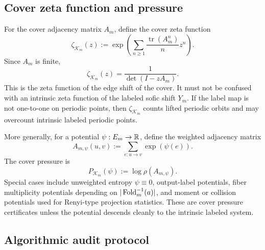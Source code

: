 \subsection{Cover zeta function and pressure}

For the cover adjacency matrix \(A_m\), define the cover zeta function
\[
\zeta_{\mathcal K_m}(z)
:=
\exp\left(\sum_{n\ge1}\frac{\operatorname{tr}(A_m^n)}{n}z^n\right).
\]
Since \(A_m\) is finite,
\[
\zeta_{\mathcal K_m}(z)=\frac{1}{\det(I-zA_m)}.
\]
This is the zeta function of the edge shift of the cover.  It must not be confused with an intrinsic zeta function of the labeled sofic shift \(Y_m\).  If the label map is not one-to-one on periodic points, then \(\zeta_{\mathcal K_m}\) counts lifted periodic orbits and may overcount intrinsic labeled periodic points.

More generally, for a potential \(\psi:E_m\to\mathbb{R}\), define the weighted adjacency matrix
\[
A_{m,\psi}(u,v):=\sum_{e:u\to v}\exp(\psi(e)).
\]
The cover pressure is
\[
P_{\mathcal K_m}(\psi):=\log\rho(A_{m,\psi}).
\]
Special cases include unweighted entropy \(\psi\equiv0\), output-label potentials, fiber multiplicity potentials depending on \(|\operatorname{Fold}_m^{-1}(a)|\), and moment or collision potentials used for Renyi-type projection statistics.  These are cover pressure certificates unless the potential descends cleanly to the intrinsic labeled system.

\subsection{Algorithmic audit protocol}

